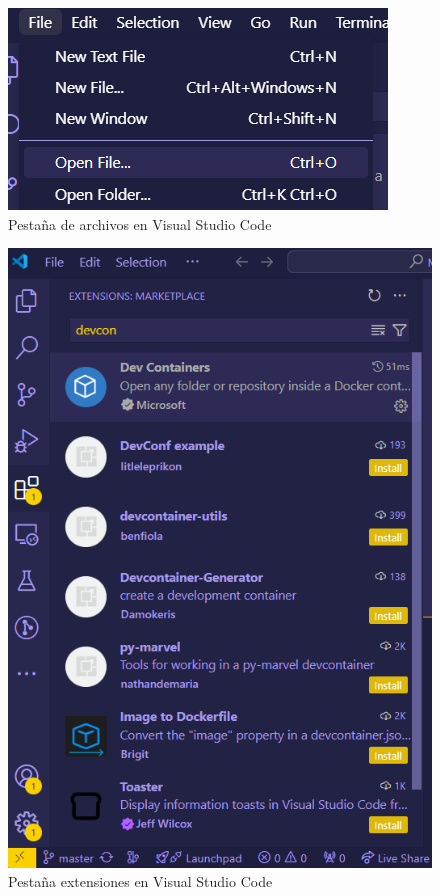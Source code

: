 \begin{figure}[!h]  
    \centering  
    \includegraphics[width=\textwidth]{img/FileVS.png}  
    \caption{Pestaña de archivos en Visual Studio Code}  
    \label{fig:FileVS}
\end{figure}
\begin{figure}[!h]  
    \centering  
    \includegraphics[width=\textwidth]{img/Extensiones.png}  
    \caption{Pestaña extensiones en Visual Studio Code}  
    \label{fig:Extensiones}
\end{figure}
